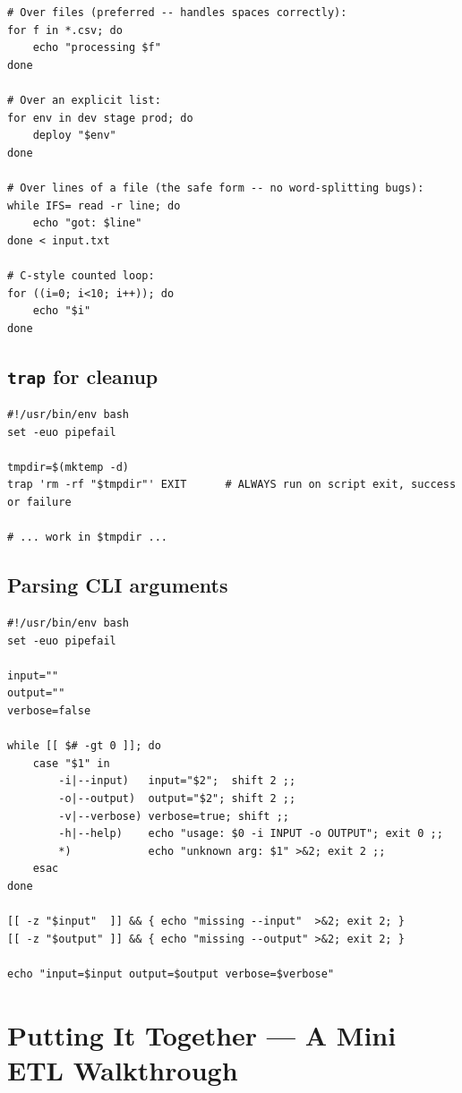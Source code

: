 \documentclass[11pt,a4paper]{article}
\begin{document}
\begin{lstlisting}[style=bashstyle]
# Over files (preferred -- handles spaces correctly):
for f in *.csv; do
    echo "processing $f"
done

# Over an explicit list:
for env in dev stage prod; do
    deploy "$env"
done

# Over lines of a file (the safe form -- no word-splitting bugs):
while IFS= read -r line; do
    echo "got: $line"
done < input.txt

# C-style counted loop:
for ((i=0; i<10; i++)); do
    echo "$i"
done
\end{lstlisting}

\subsection*{\texttt{trap} for cleanup}

\begin{lstlisting}[style=bashstyle]
#!/usr/bin/env bash
set -euo pipefail

tmpdir=$(mktemp -d)
trap 'rm -rf "$tmpdir"' EXIT      # ALWAYS run on script exit, success or failure

# ... work in $tmpdir ...
\end{lstlisting}

\subsection*{Parsing CLI arguments}

\begin{lstlisting}[style=bashstyle]
#!/usr/bin/env bash
set -euo pipefail

input=""
output=""
verbose=false

while [[ $# -gt 0 ]]; do
    case "$1" in
        -i|--input)   input="$2";  shift 2 ;;
        -o|--output)  output="$2"; shift 2 ;;
        -v|--verbose) verbose=true; shift ;;
        -h|--help)    echo "usage: $0 -i INPUT -o OUTPUT"; exit 0 ;;
        *)            echo "unknown arg: $1" >&2; exit 2 ;;
    esac
done

[[ -z "$input"  ]] && { echo "missing --input"  >&2; exit 2; }
[[ -z "$output" ]] && { echo "missing --output" >&2; exit 2; }

echo "input=$input output=$output verbose=$verbose"
\end{lstlisting}

\section{Putting It Together --- A Mini ETL Walkthrough}
\end{document}

